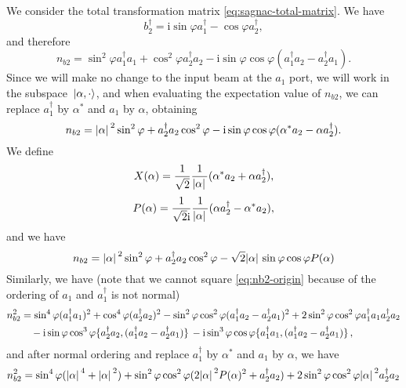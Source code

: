\documentclass[hyperref, a4paper]{article}
\newcommand*{\ii}{\mathrm{i}}
\begin{document}
\begin{itemize}
    We consider the total transformation matrix \eqref{eq:sagnac-total-matrix}. We have 
    \[
        b_2^\dagger = \ii \sin \varphi a_1^\dagger - \cos \varphi a_2^\dagger,
    \] 
    and therefore 
    \[
        n_{b2} = \sin^2 \varphi a_1^\dagger a_1 + \cos^2 \varphi a_2^\dagger a_2 - \ii \sin \varphi \cos \varphi (a_1^\dagger a_2 - a_2^\dagger a_1).
    \]
    Since we will make no change to the input beam at the $a_1$ port, we will work in the subspace 
    $\ket*{\alpha, \cdot}$, and when evaluating the expectation value of $n_{b2}$, we can replace 
    $a_1^\dagger$ by $\alpha^*$ and $a_1$ by $\alpha$, obtaining
    \[
        n_{b2} = \abs*{\alpha}^2 \sin^2 \varphi + a_2^\dagger a_2 \cos^2 \varphi - \ii \sin \varphi \cos \varphi 
        (\alpha^* a_2 - \alpha a_2^\dagger).
    \]
    We define 
    \begin{equation}
        X(\alpha) = \frac{1}{\sqrt{2}} \frac{1}{\abs*{\alpha}} (\alpha^* a_2 + \alpha a_2^\dagger),
    \end{equation}
    \begin{equation}
        P(\alpha) = \frac{1}{\sqrt{2} \ii} \frac{1}{\abs*{\alpha}} (\alpha a^\dagger_2 - \alpha^* a_2),
    \end{equation}
    and we have 
    \begin{equation}
        n_{b2} = \abs*{\alpha}^2 \sin^2 \varphi + a_2^\dagger a_2 \cos^2 \varphi - \sqrt{2} \abs*{\alpha} \sin \varphi \cos \varphi P(\alpha)
        \label{eq:nb2-origin}
    \end{equation}
    Similarly, we have (note that we cannot square \eqref{eq:nb2-origin} because of the ordering of $a_1$ and
    $a_1^\dagger$ is not normal)
    \[
        \begin{aligned}
            n_{b2}^2 &= \sin^4 \varphi (a_1^\dagger a_1)^2 + \cos^4 \varphi (a_2^\dagger a_2)^2 - \sin^2 \varphi \cos^2 \varphi (a_1^\dagger a_2 - a_2^\dagger a_1)^2 + 2 \sin^2 \varphi \cos^2 \varphi a_1^\dagger a_1 a_2^\dagger a_2 \\
            &\quad - \ii \sin \varphi \cos^3 \varphi \acomm*{a_2^\dagger a_2}{(a_1^\dagger a_2 - a_2^\dagger a_1)}
            - \ii \sin^3 \varphi \cos \varphi \acomm*{a_1^\dagger a_1}{(a_1^\dagger a_2 - a_2^\dagger a_1)},
        \end{aligned}
    \]
    and after normal ordering and replace $a_1^\dagger$ by $\alpha^*$ and $a_1$ by $\alpha$, we have 
    \begin{equation}
        \begin{aligned}
            n_{b2}^2 &= \sin^4 \varphi (\abs*{\alpha}^4 + \abs*{\alpha}^2) + \sin^2 \varphi \cos^2 \varphi (2 \abs*{\alpha}^2 P(\alpha)^2 + a_2^\dagger a_2) + 2 \sin^2 \varphi \cos^2 \varphi \abs*{\alpha}^2 a_2^\dagger a_2 \\

\end{aligned}
\end{equation}
\end{itemize}
\end{document}
